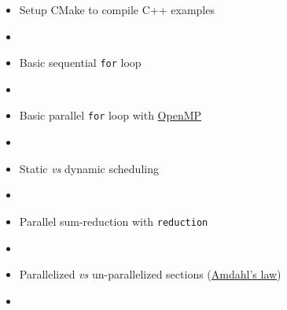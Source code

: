 \documentclass[12pt,aspectratio=169,xcolor=dvipsnames,hyperref={colorlinks,urlcolor=iiia_orange}]{beamer}
\begin{document}
\begin{frame}{}
    \begin{itemize}
        \setlength\itemsep{-1pt}
        \item[\faGithub] Setup CMake to compile C++ examples
        \item[] 
        \item[\faGithub] Basic sequential \texttt{for} loop
        \item[] 
        \item[\faGithub] Basic parallel \texttt{for} loop with \href{https://www.openmp.org}{OpenMP}
        \item[] 
        \item[\faGithub] Static \textit{vs} dynamic scheduling
        \item[] 
        \item[\faGithub] Parallel sum-reduction with \texttt{reduction}
        \item[] 
        \item[\faGithub] Parallelized \textit{vs} un-parallelized sections (\href{https://en.wikipedia.org/wiki/Amdahl\%27s_law}{Amdahl's law})
        \item[] 
    \end{itemize}
\end{frame}
\end{document}
